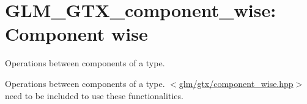 \hypertarget{group__gtx__component__wise}{\section{\-G\-L\-M\-\_\-\-G\-T\-X\-\_\-component\-\_\-wise\-: \-Component wise}
\label{group__gtx__component__wise}
}


\-Operations between components of a type.  


\-Operations between components of a type. $<$\hyperlink{component__wise_8hpp}{glm/gtx/component\-\_\-wise.\-hpp}$>$ need to be included to use these functionalities. 